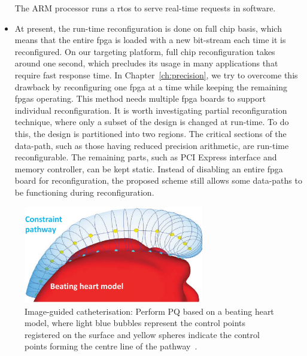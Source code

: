 \begin{itemize}
The ARM processor runs a \gls{rtos} to serve real-time requests in software.
\item At present, the run-time reconfiguration is done on full chip basis, which means that the entire \gls{fpga} is loaded with a new bit-stream each time it is reconfigured.
On our targeting platform, full chip reconfiguration takes around one second, which precludes its usage in many applications that require fast response time.
In Chapter~\ref{ch:precision}, we try to overcome this drawback by reconfiguring one \gls{fpga} at a time while keeping the remaining \glspl{fpga} operating.
This method needs multiple \gls{fpga} boards to support individual reconfiguration.
It is worth investigating partial reconfiguration technique, where only a subset of the design is changed at run-time.
To do this, the design is partitioned into two regions.
The critical sections of the data-path, such as those having reduced precision arithmetic, are run-time reconfigurable.
The remaining parts, such as PCI Express interface and memory controller, can be kept static.
Instead of disabling an entire \gls{fpga} board for reconfiguration, the proposed scheme still allows some data-paths to be functioning during reconfiguration.
\end{itemize}

\begin{figure}[t!]
\centering
\includegraphics[width=0.7\textwidth]{6_conclusion/figures/heart_model}
\caption{Image-guided catheterisation: Perform PQ based on a beating heart model, where light blue bubbles represent the control points registered on the surface and yellow spheres indicate the control points forming the centre line of the pathway~\cite{kwok13}.}
\label{fig:heart_model}
\end{figure}

